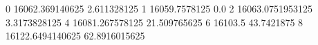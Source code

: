 0 16062.369140625 2.611328125
1 16059.7578125 0.0
2 16063.0751953125 3.3173828125
4 16081.267578125 21.509765625
6 16103.5 43.7421875
8 16122.6494140625 62.8916015625
